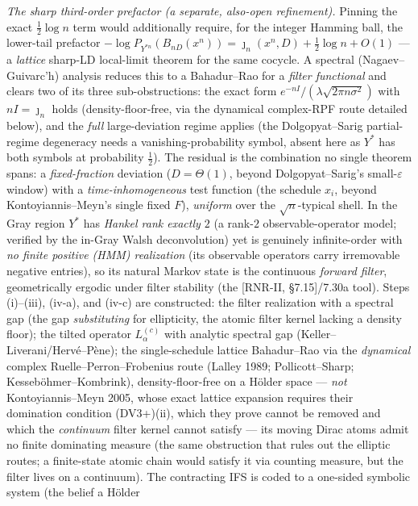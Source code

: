 \documentclass[
]{article}
\begin{document}
\emph{The sharp third-order prefactor (a separate, also-open refinement).} Pinning the exact
$\tfrac12\log n$ term would additionally require, for the integer Hamming ball, the lower-tail
prefactor $-\log P_{Y^{*n}}(B_{nD}(x^n))=\jmath_n(x^n,D)+\tfrac12\log n+O(1)$ --- a \emph{lattice}
sharp-LD local-limit theorem for the same cocycle. A spectral (Nagaev--Guivarc'h)
analysis reduces this to a Bahadur--Rao for a \emph{filter functional} and clears two of its three
sub-obstructions: the exact form $e^{-nI}/(\lambda\sqrt{2\pi n\sigma^2})$ with $nI=\jmath_n$ holds
(density-floor-free, via the dynamical complex-RPF route detailed below), and the \emph{full}
large-deviation regime applies (the Dolgopyat--Sarig partial-regime degeneracy needs a
vanishing-probability symbol, absent here as $Y^*$ has both symbols at probability $\tfrac12$). The
residual is the combination no single theorem spans: a \emph{fixed-fraction} deviation ($D=\Theta(1)$,
beyond Dolgopyat--Sarig's small-$\varepsilon$ window) with a \emph{time-inhomogeneous} test function
(the schedule $x_i$, beyond Kontoyiannis--Meyn's single fixed $F$), \emph{uniform} over the
$\sqrt n$-typical shell. In the Gray region $Y^*$ has \emph{Hankel rank exactly $2$} (a rank-$2$
observable-operator model; verified by the in-Gray Walsh deconvolution) yet is genuinely
infinite-order with \emph{no finite positive (HMM) realization} (its observable operators carry
irremovable negative entries), so its natural Markov state is the continuous \emph{forward filter},
geometrically ergodic under filter stability (the [RNR-II, §7.15]/7.30a tool). Steps (i)--(iii), (iv-a), and (iv-c) are
constructed: the filter realization with a spectral gap (the gap \emph{substituting} for ellipticity,
the atomic filter kernel lacking a density floor); the tilted operator $L_\alpha^{(c)}$ with analytic
spectral gap (Keller--Liverani/Herv\'e--P\`ene); the single-schedule lattice Bahadur--Rao via the
\emph{dynamical} complex Ruelle--Perron--Frobenius route (Lalley 1989; Pollicott--Sharp;
Kesseb\"ohmer--Kombrink), density-floor-free on a H\"older space --- \emph{not} Kontoyiannis--Meyn
2005, whose exact lattice expansion requires their domination condition (DV3+)(ii), which they prove
cannot be removed and which the \emph{continuum} filter kernel cannot satisfy --- its moving Dirac
atoms admit no finite dominating measure (the same obstruction that rules out the elliptic routes;
a finite-state atomic chain would satisfy it via counting measure, but the filter lives on a
continuum). The contracting IFS is coded to a one-sided symbolic system (the belief a H\"older
\end{document}
